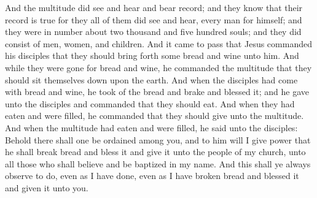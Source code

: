 And the multitude did see and hear and bear record; and they know that their record is true for they all of them did see and hear, every man for himself; and they were in number about two thousand and five hundred souls; and they did consist of men, women, and children.
\bchapter
\bverse \iffalse And it came to pass that Jesus commanded his disciples that they should bring forth some bread and wine unto him. \fi
And it came to pass that Jesus commanded his disciples that they should bring forth some bread and wine unto him.
\bverse \iffalse And while they were gone for bread and wine, he commanded the multitude that they should sit themselves down upon the earth. \fi
And while they were gone for bread and wine, he commanded the multitude that they should sit themselves down upon the earth.
\bverse \iffalse And when the disciples had come with bread and wine, he took of the bread and brake and blessed it; and he gave unto the disciples and commanded that they should eat. \fi
And when the disciples had come with bread and wine, he took of the bread and brake and blessed it; and he gave unto the disciples and commanded that they should eat.
\bverse \iffalse And when they had eaten and were filled, he commanded that they should give unto the multitude. \fi
And when they had eaten and were filled, he commanded that they should give unto the multitude.
\bverse \iffalse And when the multitude had eaten and were filled, he said unto the disciples: Behold there shall one be ordained among you, and to him will I give power that he shall break bread and bless it and give it unto the people of my church, unto all those who shall believe and be baptized in my name. \fi
And when the multitude had eaten and were filled, he said unto the disciples: Behold there shall one be ordained among you, and to him will I give power that he shall break bread and bless it and give it unto the people of my church, unto all those who shall believe and be baptized in my name.
\bverse \iffalse And this shall ye always observe to do, even as I have done, even as I have broken bread and blessed it and given it unto you. \fi
And this shall ye always observe to do, even as I have done, even as I have broken bread and blessed it and given it unto you.
\bverse \iffalse And this shall ye do in remembrance of my body, which I have shown unto you. And it shall be a testimony unto the Father that ye do always remember me. And if ye do always remember me ye shall have my Spirit to be with you. \fi
